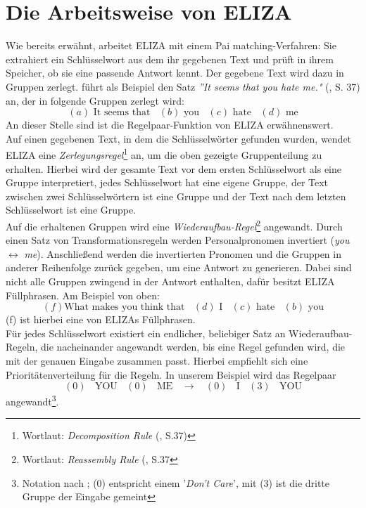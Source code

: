 \documentclass[12pt,twoside]{article}
\theoremstyle{plain}
\theoremstyle{definition}
\theoremstyle{remark}
\begin{document}
\section{Die Arbeitsweise von ELIZA}
\label{sec:eliza}
Wie bereits erwähnt, arbeitet ELIZA mit einem Pai matching-Verfahren: Sie extrahiert ein Schlüsselwort aus dem ihr gegebenen Text und prüft in ihrem Speicher, ob sie eine passende Antwort kennt.
Der gegebene Text wird dazu in Gruppen zerlegt.
\cite{Weizenbaum1966} führt als Beispiel den Satz \textit{''It seems that you hate me."} (\cite{Weizenbaum1966}, S. 37) an, der in folgende Gruppen zerlegt wird:
\[
(a)\text{ It seems that}~~~~(b)\text{ you}~~~~(c)\text{ hate}~~~~(d)\text{ me}
\]
An dieser Stelle sind ist die Regelpaar-Funktion von ELIZA erwähnenswert.\\
Auf einen gegebenen Text, in dem die Schlüsselwörter gefunden wurden, wendet ELIZA eine \textit{Zerlegungsregel}\footnote{Wortlaut: \textit{Decomposition Rule} (\cite{Weizenbaum1966}, S.37)} an, um die oben gezeigte Gruppenteilung zu erhalten.
Hierbei wird der gesamte Text vor dem ersten Schlüsselwort als eine Gruppe interpretiert, jedes Schlüsselwort hat eine eigene Gruppe, der Text zwischen zwei Schlüsselwörtern ist eine Gruppe und der Text nach dem letzten Schlüsselwort ist eine Gruppe.\\
Auf die erhaltenen Gruppen wird eine \textit{Wiederaufbau-Regel}\footnote{Wortlaut: \textit{Reassembly Rule} (\cite{Weizenbaum1966}, S.37} angewandt.
Durch einen Satz von Transformationsregeln werden Personalpronomen invertiert (\textit{you} $\leftrightarrow$ \textit{me}).
Anschließend werden die invertierten Pronomen und die Gruppen in anderer Reihenfolge zurück gegeben, um eine Antwort zu generieren.
Dabei sind nicht alle Gruppen zwingend in der Antwort enthalten, dafür besitzt ELIZA Füllphrasen.
Am Beispiel von oben:
\[
	(f)\text{What makes you think that}~~~~(d)\text{ I}~~~~(c)\text{ hate}~~~~(b)\text{ you}
\]
(f) ist hierbei eine von ELIZAs Füllphrasen.\\
Für jedes Schlüsselwort existiert ein endlicher, beliebiger Satz an Wiederaufbau-Regeln, die nacheinander angewandt werden, bis eine Regel gefunden wird, die mit der genauen Eingabe zusammen passt.
Hierbei empfiehlt sich eine Prioritätenverteilung für die Regeln.
In unserem Beispiel wird das Regelpaar
\[
	(0)~~~~\text{YOU}~~~~(0)~~~~\text{ME}~~~~\longrightarrow~~~~(0)~~~~\text{I}~~~~(3)~~~~\text{YOU}
\]
angewandt\footnote{Notation nach \cite{Weizenbaum1966}; (0) entspricht einem '\textit{Don't Care}', mit (3) ist die dritte Gruppe der Eingabe gemeint}.
\end{document}
